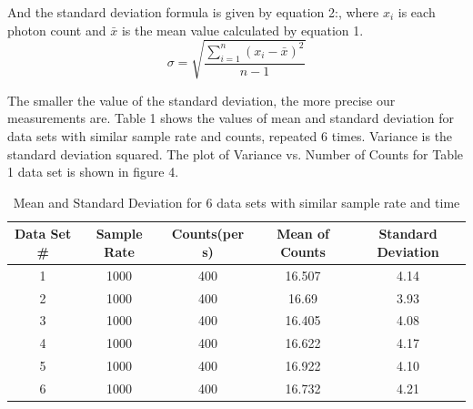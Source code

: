 \documentclass[letterpaper,12pt]{article}
\begin{document}
And the standard deviation formula is given by equation 2:, where \begin{math}x_i \end{math} is each photon count and \begin{math} \bar{x} \end{math} is the mean value calculated by equation 1. 
\begin{equation} \label{E:sd}
\sigma = \sqrt{\frac{\sum\limits_{i=1}^{n}
\left(x_{i} - \bar{x}\right)^{2}}
{n-1}}
\end{equation}

The smaller the value of the standard deviation, the more precise our measurements are. Table 1 shows the values of mean and standard deviation for data sets with similar sample rate and counts, repeated 6 times. Variance is the standard deviation squared. The plot of Variance vs. Number of Counts for Table 1 data set is shown in figure 4.

\begin{table}[ht]
\caption{Mean and Standard Deviation for 6 data sets with similar sample rate and time} %
\centering %
\begin{tabular}{c c c c c} %
\hline\hline %
Data Set \# & Sample Rate & Counts(per s) & Mean of Counts & Standard Deviation \\ [0.5ex] %
\hline %
1 & 1000 & 400 & 16.507 & 4.14\\ %
2 & 1000 & 400& 16.69  & 3.93\\
3 & 1000 & 400& 16.405  & 4.08\\
4 & 1000 & 400 & 16.622 & 4.17\\
5 & 1000 & 400 & 16.922 & 4.10\\ 
6 & 1000 & 400 & 16.732 & 4.21 \\ [1ex] %
\hline %
\end{tabular}
\label{table:nonlin} %
\end{table}
\end{document}
